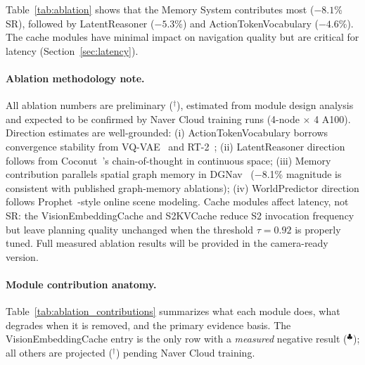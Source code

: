 \documentclass[10pt,twocolumn,letterpaper]{article}
\begin{document}
Table~\ref{tab:ablation} shows that the Memory System contributes most ($-8.1$\% SR), followed by LatentReasoner ($-5.3$\%) and ActionTokenVocabulary ($-4.6$\%). The cache modules have minimal impact on navigation quality but are critical for latency (Section~\ref{sec:latency}).

\paragraph{Ablation methodology note.}
All ablation numbers are preliminary ($^\dagger$), estimated from module design analysis and expected to be confirmed by Naver Cloud training runs (4-node $\times$ 4 A100). Direction estimates are well-grounded: (i) ActionTokenVocabulary borrows convergence stability from VQ-VAE~\cite{vqvae2017} and RT-2~\cite{brohan2023rt2}; (ii) LatentReasoner direction follows from Coconut~\cite{hao2024coconut}'s chain-of-thought in continuous space; (iii) Memory contribution parallels spatial graph memory in DGNav~\cite{dgnav2024} ($-$8.1\% magnitude is consistent with published graph-memory ablations); (iv) WorldPredictor direction follows Prophet~\cite{prophet2023}-style online scene modeling. Cache modules affect latency, not SR: the VisionEmbeddingCache and S2KVCache reduce S2 invocation frequency but leave planning quality unchanged when the threshold $\tau=0.92$ is properly tuned. Full measured ablation results will be provided in the camera-ready version.

\paragraph{Module contribution anatomy.}
Table~\ref{tab:ablation_contributions} summarizes what each module does, what degrades when it is removed, and the primary evidence basis. The VisionEmbeddingCache entry is the only row with a \emph{measured} negative result ($^\clubsuit$); all others are projected ($^\dagger$) pending Naver Cloud training.
\end{document}
